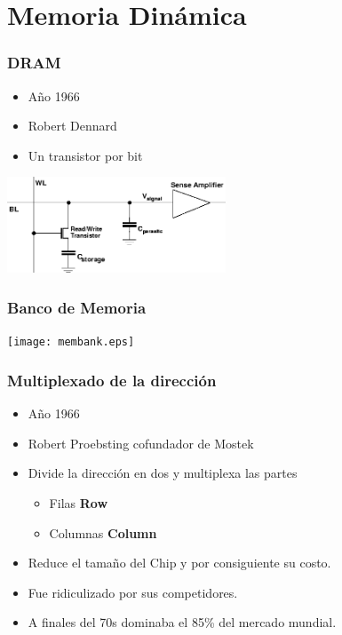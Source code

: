 \documentclass{beamer}
\begin{document}
\section{Memoria Dinámica}
\begin{frame}
\frametitle{DRAM}
	\begin{minipage}[c]{4.5cm}
		\begin{center}
			\begin{itemize}
				\item Año 1966
				\item Robert Dennard
				\item Un transistor por bit
			\end{itemize}
		\end{center}
	\end{minipage}
	\begin{minipage}[c]{6.5cm}
		\begin{center}
		\includegraphics[width=6.5cm]{onetransistor.png} 
		\end{center}
	\end{minipage}
\end{frame}

\begin{frame}
\frametitle{Banco de Memoria}
	\begin{center}
		\texttt{[image: membank.eps]}
	\end{center}
\end{frame}

\begin{frame}
\frametitle{Multiplexado de la dirección}
	\begin{itemize}
		\item Año 1966
		\item Robert Proebsting cofundador de Mostek
		\item Divide la dirección en dos y multiplexa las partes
			\begin{itemize}
				\item Filas \textbf{Row}
				\item Columnas \textbf{Column}
			\end{itemize}
		\item Reduce el tamaño del Chip y por consiguiente su costo.
		\item Fue ridiculizado por sus competidores.
		\item A finales del 70s dominaba el 85\% del mercado mundial.
	\end{itemize}
\end{frame}
\end{document}
